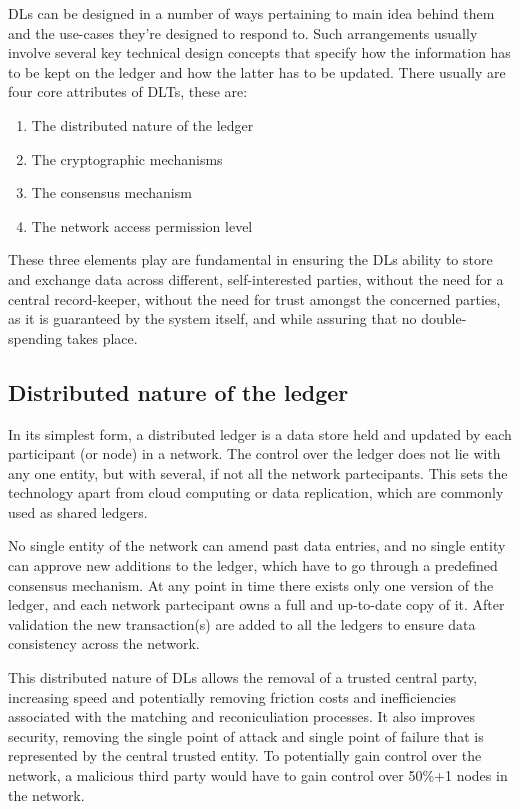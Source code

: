 DLs can be designed in a number of ways pertaining to main idea behind them and the use-cases they're designed to respond to. Such arrangements usually involve several key technical design concepts that specify how the information has to be kept on the ledger and how the latter has to be updated. 
There usually are four core attributes of DLTs, these are:
\begin{enumerate}
    \item The distributed nature of the ledger
    \item The cryptographic mechanisms
    \item The consensus mechanism
    \item The network access permission level
\end{enumerate}

These three elements play are fundamental in ensuring the DLs ability to store and exchange data across different, self-interested parties, without the need for a central record-keeper, without the need for trust amongst the concerned parties, as it is guaranteed by the system itself, and while assuring that no double-spending takes place.

\subsection{Distributed nature of the ledger}
In its simplest form, a distributed ledger is a data store held and updated by each participant (or node) in a network. The control over the ledger does not lie with any one entity, but with several, if not all the network partecipants. This sets the technology apart from cloud computing or data replication, which are commonly used as shared ledgers.

No single entity of the network can amend past data entries, and no single entity can approve new additions to the ledger, which have to go through a predefined consensus mechanism. At any point in time there exists only one version of the ledger, and each network partecipant owns a full and up-to-date copy of it.
After validation the new transaction(s) are added to all the ledgers to ensure data consistency across the network.

This distributed nature of DLs allows the removal of a trusted central party, increasing speed and potentially removing friction costs and inefficiencies associated with the matching and reconiculiation processes. It also improves security, removing the single point of attack and single point of failure that is represented by the central trusted entity. To potentially gain control over the network, a malicious third party would have to gain control over 50\%+1 nodes in the network. 

